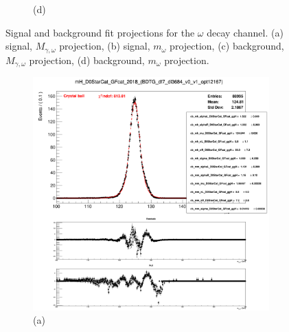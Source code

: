 \begin{figure}[!ht]
\begin{subfigure}[t]{0.50\mylength}
        \caption{\footnotesize (d)}
    \end{subfigure}%
\caption{Signal and background fit projections for the $\omega$ decay channel. (a) signal, $M_{\gamma, \omega}$ projection, (b) signal, $m_{\omega}$ projection, (c) background, $M_{\gamma, \omega}$ projection, (d) background, $m_{\omega}$ projection.}
\label{fig:sig_bkg_modelling_omega}
    \vspace*{-0.0cm}
\end{figure}

\begin{figure}[!ht]
    \captionsetup[subfigure]{labelformat=empty}
    \vspace*{-0.2cm}
    \centering
    \setlength{\mylength}{\textwidth}
    \begin{subfigure}[t]{0.50\mylength}
        \centering
        \includegraphics[width=0.45\mylength]{resources/plots/D0Star_2body_fit_SGN_MH.png}
        \caption{\footnotesize (a)}
    \end{subfigure}%
    \begin{subfigure}[t]{0.50\mylength}
        \centering

\end{subfigure}
\end{figure}
